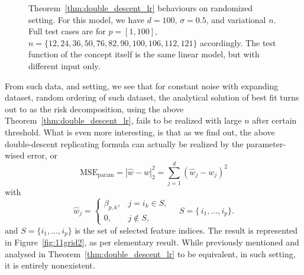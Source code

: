 \documentclass[10pt,oneside,oldfontcommands,dvipsnames,article]{memoir}
\begin{document}
\begin{figure}[htb]
  \caption{Theorem~\ref{thm:double_descent_lr} behaviours on randomized setting. For this model, we have $d=100$, $\sigma = 0.5$, and variational $n$. Full test cases are for $p=[1,100]$, $n=\{12,24,36,50,76,82,90,100,106,112,121\}$ accordingly. The test function of the concept itself is the same linear model, but with different input only.}
  \label{fig:11grid}
\end{figure}

From such data, and setting, we see that for constant noise with expanding dataset, random ordering of such dataset, the analytical solution of best fit turns out to as the risk decomposition, using the above Theorem~\ref{thm:double_descent_lr}, fails to be realized with large $n$ after certain threshold. What is even more interesting, is that as we find out, the above double-descent replicating formula can actually be realized by the parameter-wised error, or 
\begin{equation}
\mathrm{MSE}_{\mathrm{param}}=\left\lvert \hat w - w \right\rvert _{2}^{2}=
\sum_{j=1}^{d}
\left(
  \hat w_{j} - w_{j}
\right)^{2}
\end{equation}
with 
\begin{equation}
\hat w_{j}
=
\begin{cases}
\beta_{p,k}, & j = i_{k} \in S,\\[6pt]
0,           & j \notin S,
\end{cases}
\quad
S = \{\,i_{1},\dots,i_{p}\}.
\end{equation}
and \(S=\{i_1,\dots,i_p\}\) is the set of selected feature indices. The result is represented in Figure~\ref{fig:11grid2}, as per elementary result. While previously mentioned and analysed in Theorem~\ref{thm:double_descent_lr} to be equivalent, in such setting, it is entirely nonexistent. 
\end{document}
